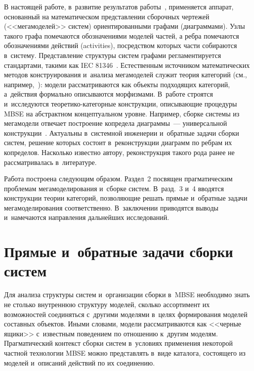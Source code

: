 \begin{multicols}{2}
   В настоящей работе, в~развитие результатов работы~\cite{4-kov}, применяется 
аппарат, основанный на математическом представлении сборочных чертежей 
(<<мегамоделей>> сис\-тем) ориентированными графами (диаграммами). Узлы 
такого графа помечаются обозначениями моделей частей, а ребра помечаются 
обозначениями действий (activities), посредством которых части собираются 
в~сис\-те\-му. Представление структуры сис\-тем графами регламентируется 
стандартами, такими как IEC 81346~\cite{5-kov}. Естественным источником 
математических методов конструирования и~анализа мегамоделей служит 
теория категорий (см., например,~\cite{6-kov}): модели\linebreak
 рассматриваются как объекты 
подходящих ка\-те\-горий, а~действия формально описываются мор\-физмами. 
В~работе строятся и~исследуются тео\-ретико-ка\-те\-гор\-ные конструкции, 
описывающие процедуры MBSE на абстрактном концептуальном уровне. 
Например, сборке сис\-те\-мы из мегамодели отвечает построение копредела 
диаграммы~--- универсальной конструкции~\cite{6-kov}. Актуальны в~сис\-тем\-ной 
инженерии и~обратные задачи сборки \mbox{сис\-тем}, решение которых со\-сто\-ит 
в~реконструкции диаграмм по реб\-рам их копределов. Насколько известно 
автору, реконструкция такого рода ранее не рассматривалась в~литературе.
   
   Работа построена следующим образом. Раздел~2 посвящен прагматическим 
проблемам мегамоделирования и~сборке сис\-тем. В~разд.~3 и~4 вводятся 
конструкции теории категорий, позволяющие решать прямые и~обратные 
задачи мегамоделирования соответственно. В~заключении приводятся выводы 
и~намечаются направления дальнейших исследований.

\section{Прямые и~обратные задачи сборки систем}

   Для анализа структуры сис\-тем и~организации сборки в~MBSE необходимо 
знать не столько внут\-рен\-нюю структуру моделей, сколько ассортимент их 
возможностей соединяться с~другими моделями в~целях формирования моделей 
составных объектов. Иными словами, модели рассматриваются как <<черные 
ящики>> с~известным поведением по отношению к~другим моделям. 
Прагматический контекст сборки сис\-тем в~условиях применения некоторой 
частной технологии MBSE можно представлять в~виде каталога, состоящего из 
моделей и~описаний действий по их соединению.
   

\end{multicols}
